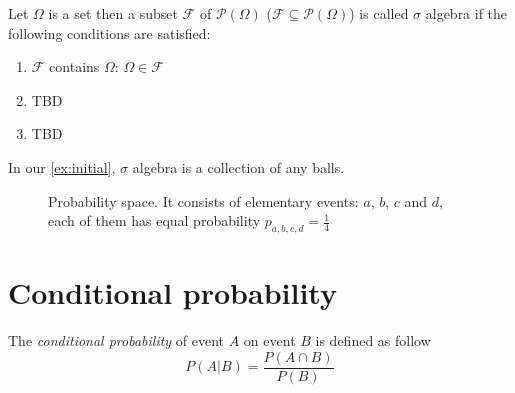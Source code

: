 \begin{definition}
Let $\Omega$ is a set then a subset $\mathcal{F}$ of
 $\mathcal{P}\left(\Omega\right)$ ($\mathcal{F}\subseteq
\mathcal{P}\left(\Omega\right)$) is called $\sigma$ algebra if the
following conditions are 
satisfied:
\begin{enumerate}
\item $\mathcal{F}$ contains $\Omega$: $\Omega \in \mathcal{F}$
\item TBD
\item TBD
\end{enumerate} 
\end{definition}

In our \cref{ex:initial}, $\sigma$ algebra is a collection of any
balls. 

\begin{figure}
  \centering
  \caption{Probability space. It consists of elementary events: $a$,
    $b$, $c$ and $d$, each
    of them has equal probability $p_{a,b,c,d} = \frac{1}{4}$}
  \label{fig:probabilityspace}
\end{figure}

\section{Conditional probability}

\begin{definition}
\label{def:conditionalprobability}
The \textit{conditional probability} of event $A$ on event $B$ is
defined as follow
\[
P(A|B) = \frac{P\left(A \cap B\right)}{P(B)}
\]
\end{definition}

